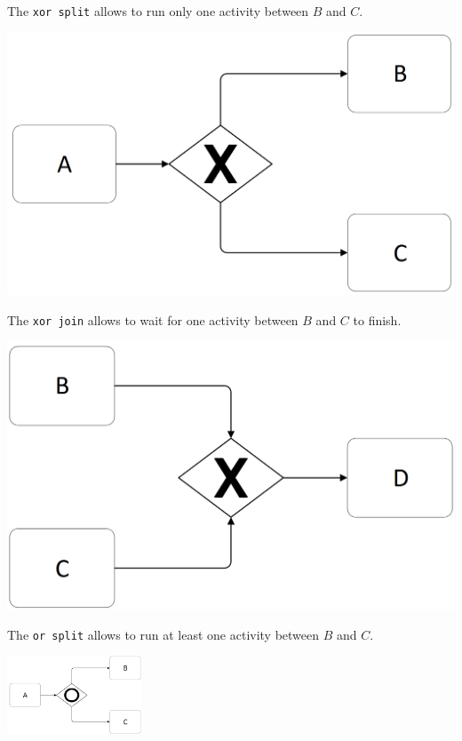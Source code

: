 \begin{description}
        \begin{example} \phantom{}\\
            \begin{minipage}{0.49\textwidth}
                The \texttt{xor split} allows to run only one activity between $B$ and $C$.
                \begin{center}
                    \includegraphics[width=0.6\linewidth]{img/bp_control_flow_xor_split.png}
                \end{center}
            \end{minipage}
            \hspace{0.02\textwidth}
            \begin{minipage}{0.49\textwidth}
                The \texttt{xor join} allows to wait for one activity between $B$ and $C$ to finish.
                \begin{center}
                    \includegraphics[width=0.6\linewidth]{img/bp_control_flow_xor_join.png}
                \end{center}
            \end{minipage}
        \end{example}

        \begin{example}
            The \texttt{or split} allows to run at least one activity between $B$ and $C$.
            \begin{center}
                \includegraphics[width=0.3\textwidth]{img/bp_control_flow_or_split.png}
            \end{center}
        \end{example}


\end{description}
